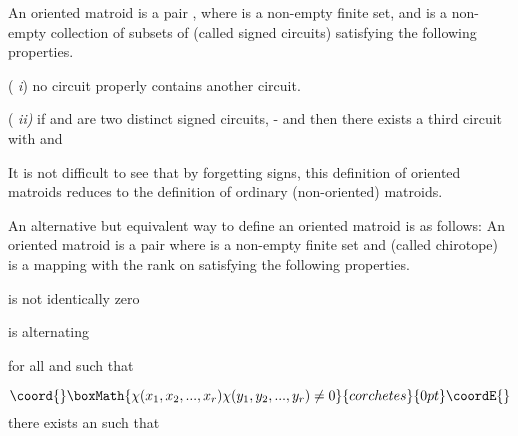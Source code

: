 \documentclass[a4paper,12pt]{article}
\begin{document}
An oriented matroid \coordHE{} is a pair \coordHE{}, where \coordHE{} is
a non-empty finite set, and \coordHE{} is a non-empty collection of
subsets of \coordHE{} (called signed circuits) satisfying the following properties.

(\coordHE{} \textit{i}) no circuit properly contains another circuit.

(\coordHE{} \textit{ii) }if \coordHE{} and \coordHE{} are
two distinct signed circuits, \coordHE{}-\coordHE{} and \coordHE{} then there exists a third
circuit \coordHE{} with \coordHE{} and \coordHE{}

It is not difficult to see that by forgetting signs, this definition of
oriented matroids reduces to the definition of ordinary (non-oriented)
matroids.

An alternative but equivalent way to define an oriented matroid is as
follows: An oriented matroid \coordHE{} is a pair \coordHE{} where \coordHE{}
is a non-empty finite set and \myHighlight{$\chi $}\coordHE{} (called chirotope) is a mapping \coordHE{} with \coordHE{} the rank on \coordHE{} satisfying the
following properties.

\coordHE{}  \myHighlight{$\chi $}\coordHE{} is not identically zero

\coordHE{} is alternating

\coordHE{} for all \coordHE{} and \coordHE{}
such that

\[\coord{}\boxMath{
\chi (x_{1},x_{2},...,x_{r})\chi (y_{1},y_{2},...,y_{r})\neq 0 
}{corchetes}{0pt}\coordE{}\]
there exists an \coordHE{} such that
\end{document}
